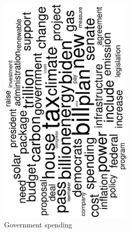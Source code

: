 \begin{figure}
	\begin{subfigure}{0.32\textwidth}
		\includegraphics[width=0.7\textwidth,angle=270]{figures/wordcloud7.eps}
		\caption{Government spending}
	\end{subfigure}
	\begin{subfigure}{0.32\textwidth}

\end{subfigure}
\end{figure}
